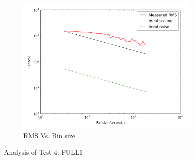 \documentclass[conference]{IEEEtran}
\begin{document}
\begin{figure}[H]
    \begin{subfigure}{3}
        \includegraphics[scale=0.6]{rms_test4}
        \caption{RMS Vs. Bin size}
    \end{subfigure}
    \caption{Analysis of Test 4: FULL1}
\end{figure}
\end{document}

